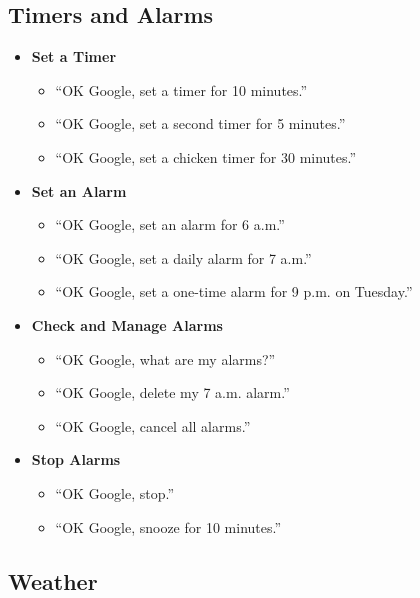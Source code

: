 \documentclass[
  jou,
  floatsintext,
  longtable,
  a4paper,
  nolmodern,
  notxfonts,
  notimes,
  12pt,
  colorlinks=true,linkcolor=blue,citecolor=blue,urlcolor=blue]{apa7}
\providecommand{\tightlist}{%
  \setlength{\itemsep}{0pt}\setlength{\parskip}{0pt}}
\begin{document}
\subsection{Timers and Alarms}\label{timers-and-alarms}

\begin{itemize}
\tightlist
\item
  \textbf{Set a Timer}

  \begin{itemize}
  \tightlist
  \item
    ``OK Google, set a timer for 10 minutes.''
  \item
    ``OK Google, set a second timer for 5 minutes.''
  \item
    ``OK Google, set a chicken timer for 30 minutes.''
  \end{itemize}
\item
  \textbf{Set an Alarm}

  \begin{itemize}
  \tightlist
  \item
    ``OK Google, set an alarm for 6 a.m.''
  \item
    ``OK Google, set a daily alarm for 7 a.m.''
  \item
    ``OK Google, set a one-time alarm for 9 p.m. on Tuesday.''
  \end{itemize}
\item
  \textbf{Check and Manage Alarms}

  \begin{itemize}
  \tightlist
  \item
    ``OK Google, what are my alarms?''
  \item
    ``OK Google, delete my 7 a.m. alarm.''
  \item
    ``OK Google, cancel all alarms.''
  \end{itemize}
\item
  \textbf{Stop Alarms}

  \begin{itemize}
  \tightlist
  \item
    ``OK Google, stop.''
  \item
    ``OK Google, snooze for 10 minutes.''
  \end{itemize}
\end{itemize}

\subsection{Weather}\label{weather}
\end{document}
